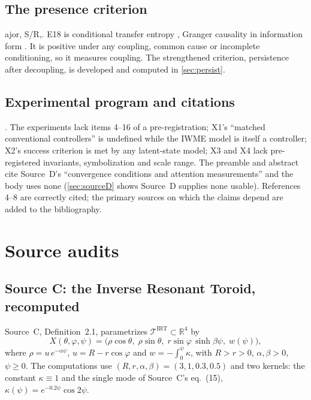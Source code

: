 \documentclass[11pt]{article}
\makeatletter
\theoremstyle{definition}
\theoremstyle{remark}
\newcommand{\R}{\mathbb{R}}
\def\finding@split#1,#2\@nil{\textbf{#1}\if\relax\detokenize{#2}\relax\else\ (\ignorespaces\finding@strip#2\@nil)\fi}
\def\finding@strip#1,\@nil{#1}
\newenvironment{finding}[1][]{\par\smallskip\noindent\finding@split#1,\@nil.\enspace\ignorespaces}{\par\smallskip}
\makeatother
\begin{document}
\subsection{The presence criterion}
\begin{finding}[F31, major, S/R] E18 is conditional transfer entropy \cite{Schreiber2000}, Granger causality in information form \cite{Granger1969}. It is positive under any coupling, common cause or incomplete conditioning, so it measures coupling. The strengthened criterion, persistence after decoupling, is developed and computed in \cref{sec:persist}.
\end{finding}

\subsection{Experimental program and citations}
\begin{finding}[F32--F35] The experiments lack items 4--16 of a pre-registration; X1's ``matched conventional controllers'' is undefined while the IWME model is itself a controller; X2's success criterion is met by any latent-state model; X3 and X4 lack pre-registered invariants, symbolization and scale range. The preamble and abstract cite Source~D's ``convergence conditions and attention measurements'' and the body uses none (\cref{sec:sourceD} shows Source~D supplies none usable). References 4--8 are correctly cited; the primary sources on which the claims depend are added to the bibliography.
\end{finding}

\section{Source audits}\label{sec:sources}

\subsection{Source C: the Inverse Resonant Toroid, recomputed}\label{sec:irt}

Source~C, Definition~2.1, parametrizes $\mathcal T^{\mathrm{IRT}}\subset\R^4$ by
\begin{equation}\label{eq:irt}
X(\theta,\varphi,\psi)=\bigl(\rho\cos\theta,\;\rho\sin\theta,\;r\sin\varphi\,\sinh\beta\psi,\;w(\psi)\bigr),
\end{equation}
where $\rho=u\,e^{-\alpha\psi}$, $u=R-r\cos\varphi$ and $w=-\int_0^\psi\kappa$, with $R>r>0$, $\alpha,\beta>0$, $\psi\ge0$. The computations use $(R,r,\alpha,\beta)=(3,1,0.3,0.5)$ and two kernels: the constant $\kappa\equiv1$ and the single mode of Source~C's eq.~(15), $\kappa(\psi)=e^{-0.2\psi}\cos2\psi$.
\end{document}
